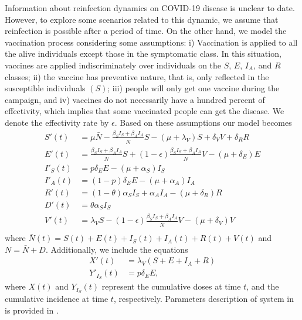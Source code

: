 Information about reinfection dynamics on COVID-19
disease is unclear to date. However, to explore some scenarios related
to this dynamic, we assume that reinfection is possible after a period
of time. On the other hand, we model the vaccination process considering
some assumptions: i) Vaccination is applied to all the alive individuals
except those in the symptomatic class. In this situation, vaccines are
applied indiscriminately over individuals on the $S$, $E$, $I_A$, and
$R$ classes; ii) the vaccine has preventive nature, that is, only
reflected in the susceptible individuals $(S)$; iii) people will only get
one vaccine during the campaign, and iv) vaccines do not necessarily have
a hundred percent of effectivity, which implies that some vaccinated people
can get the disease. We denote the effectivity rate by $\epsilon$.
Based on these assumptions our model becomes
\begin{equation}\label{model1}
    \begin{aligned}
        S'(t) &= \mu \bar{N}-\frac{\beta_S I_S +
            \beta_AI_A}{\bar{N}}S - (\mu+\lambda_V)S +
        \delta_V V+ \delta_R R
        \\
        E'(t) &= \frac{\beta_S I_S + \beta_AI_A}{\bar{N}}S+
        (1-\epsilon) \frac{\beta_S I_S+\beta_AI_A}{\bar{N}}V-(\mu+\delta_E) E
        \\
        I'_S(t) &=
        p \delta_E E-(\mu+\alpha_S) I_S
        \\
        I'_A(t) &= (1-p) \delta_E E-(\mu+\alpha_A) I_A
        \\
        R'(t)&= (1-\theta) \alpha_S I_S +
        \alpha_A I_A-(\mu+\delta_R) R
        \\
        D'(t) &= \theta \alpha_S I_S
        \\
        V'(t) &= \lambda_V S-(1-\epsilon)
        \frac{\beta_S I_S + \beta_AI_A}{\bar{N}}V - (\mu+\delta_V) V
        \\
    \end{aligned}
\end{equation}
%
where $\bar{N}(t)=S(t)+E(t)+I_S(t)+I_A(t)+R(t)+V(t)$ and
$N=\bar{N}+D$. Additionally, we include the equations
\begin{equation}
    \label{eqn:model1_counters}
    \begin{aligned}
        X'(t) &=
        \lambda_V(S + E + I_A + R)
        \\
        Y'_{I_S}(t) &=p
        \delta_E E,
    \end{aligned}
\end{equation}
where $X(t)$ and $Y_{I_S}(t)$ represent the cumulative doses at time $t$,
and the cumulative incidence at time $t$, respectively.
Parameters description of system in  is provided
in .

